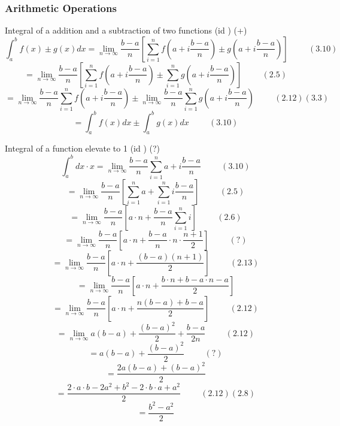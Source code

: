 \documentclass{book}
\begin{document}
                \subsubsection{Arithmetic Operations}
                    Integral of a addition and a subtraction of two functions (id \IntegralAdditionTwoFunctions) (+)
                    \[\int^b_a f(x) \pm g(x) dx = \lim_{n \rightarrow \infty} \frac{b - a}{n} \left[ \sum^n_{i=1} f\left(a + i \frac{b - a}{n}\right) \pm g\left(a + i \frac{b - a}{n} \right) \right] \hspace{1cm} (3.10)\]
                    \[= \lim_{n \rightarrow \infty} \frac{b - a}{n} \left[\sum^n_{i=1} f\left(a + i \frac{b - a}{n} \right) \pm \sum^n_{i=1} g\left(a + i \frac{b - a}{n}\right) \right] \hspace{1cm} (2.5)\]
                    \[= \lim_{n \rightarrow \infty} \frac{b - a}{n} \sum^n_{i = 1} f\left(a + i \frac{b - a}{n}\right) \pm \lim_{n \rightarrow \infty} \frac{b - a}{n} \sum^n_{i=1} g\left(a + i \frac{b - a}{n}\right) \hspace{1cm} (2.12)(3.3)\]
                    \[= \int^b_a f(x) dx \pm \int^b_a g(x) dx \hspace{1cm} (3.10)\]

                    Integral of a function elevate to 1 (id \IntegralFunctionElevate) (?)
                    \[\int^b_a dx \cdot x = \lim_{n \rightarrow \infty} \frac{b - a}{n} \sum^n_{i=1} a + i \frac{b - a}{n} \hspace{1cm} (3.10)\]
                    \[= \lim_{n \rightarrow \infty} \frac{b - a}{n} \left[\sum^n_{i=1} a + \sum^n_{i=1} i \frac{b - a}{n}\right] \hspace{1cm} (2.5)\]
                    \[= \lim_{n \rightarrow \infty} \frac{b - a}{n} \left[a \cdot n + \frac{b - a}{n} \sum^n_{i=1} i \right] \hspace{1cm} (2.6)\]
                    \[= \lim_{n \rightarrow \infty} \frac{b - a}{n} \left[a \cdot n + \frac{b - a}{n} \cdot n \cdot \frac{n + 1}{2}\right] \hspace{1cm} (?)\]
                    \[= \lim_{n \rightarrow \infty} \frac{b - a}{n} \left[a \cdot n + \frac{(b - a)(n + 1)}{2}\right] \hspace{1cm} (2.13)\]
                    \[= \lim_{n \rightarrow \infty} \frac{b - a}{n} \left[a \cdot n + \frac{b \cdot n + b - a \cdot n - a}{2}\right]\]
                    \[= \lim_{n \rightarrow \infty} \frac{b - a}{n} \left[a \cdot n + \frac{n (b - a) + b - a}{2}\right] \hspace{1cm} (2.12)\]
                    \[= \lim_{n \rightarrow \infty} a(b - a) + \frac{(b - a)^2}{2} + \frac{b - a}{2 n} \hspace{1cm} (2.12)\]
                    \[= a(b - a) + \frac{(b - a)^2}{2} \hspace{1cm} (?)\]
                    \[= \frac{2a(b - a) + (b - a)^2}{2}\]
                    \[= \frac{2 \cdot a \cdot b - 2a^2 + b^2 - 2 \cdot b \cdot a + a^2}{2} \hspace{1cm} (2.12) (2.8)\]
                    \[= \frac{b^2 - a^2}{2}\]
\end{document}
